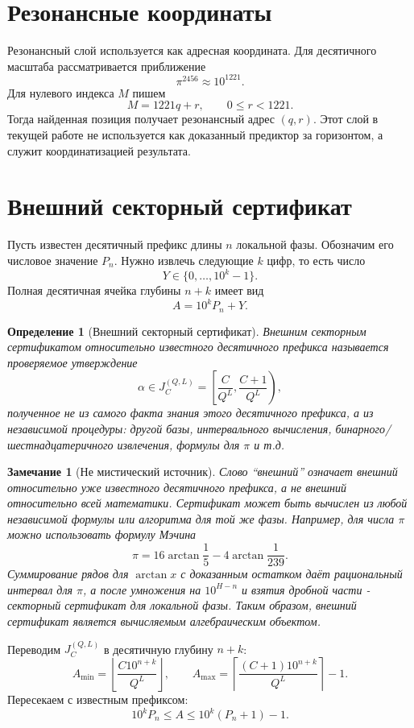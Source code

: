 \documentclass[11pt,a4paper]{article}
\newtheorem{definition}{Определение}
\newtheorem{remark}{Замечание}
\begin{document}
\section{Резонансные координаты}

Резонансный слой используется как адресная координата.  Для десятичного масштаба рассматривается приближение
\[
  \pi^{2456}\approx 10^{1221}.
\]
Для нулевого индекса $M$ пишем
\[
  M=1221q+r,
  \qquad 0\le r<1221.
\]
Тогда найденная позиция получает резонансный адрес $(q,r)$.  Этот слой в текущей работе не используется как доказанный предиктор за горизонтом, а служит координатизацией результата.

\section{Внешний секторный сертификат}

Пусть известен десятичный префикс длины $n$ локальной фазы.  Обозначим его числовое значение $P_n$.  Нужно извлечь следующие $k$ цифр, то есть число
\[
  Y\in\{0,\dots,10^k-1\}.
\]
Полная десятичная ячейка глубины $n+k$ имеет вид
\[
  A=10^kP_n+Y.
\]

\begin{definition}[Внешний секторный сертификат]
Внешним секторным сертификатом относительно известного десятичного префикса называется проверяемое утверждение
\[
  \alpha\in J_C^{(Q,L)}=\left[\frac{C}{Q^L},\frac{C+1}{Q^L}\right),
\]
полученное не из самого факта знания этого десятичного префикса, а из независимой процедуры: другой базы, интервального вычисления, бинарного/шестнадцатеричного извлечения, формулы для $\pi$ и т.д.

\end{definition}

\begin{remark}[Не мистический источник]
Слово ``внешний'' означает внешний относительно уже известного десятичного префикса, а не внешний относительно всей математики.  Сертификат может быть вычислен из любой независимой формулы или алгоритма для той же фазы.  Например, для числа $\pi$ можно использовать формулу Мэчина
\[
  \pi=16\arctan\frac15-4\arctan\frac1{239}.
\]
Суммирование рядов для $\arctan x$ с доказанным остатком даёт рациональный интервал для $\pi$, а после умножения на $10^{H-n}$ и взятия дробной части - секторный сертификат для локальной фазы.  Таким образом, внешний сертификат является вычисляемым алгебраическим объектом.
\end{remark}

Переводим $J_C^{(Q,L)}$ в десятичную глубину $n+k$:
\[
  A_{\min}=\left\lfloor\frac{C10^{n+k}}{Q^L}\right\rfloor,
  \qquad
  A_{\max}=\left\lceil\frac{(C+1)10^{n+k}}{Q^L}\right\rceil-1.
\]
Пересекаем с известным префиксом:
\[
  10^kP_n\le A\le 10^k(P_n+1)-1.
\]
\end{document}
